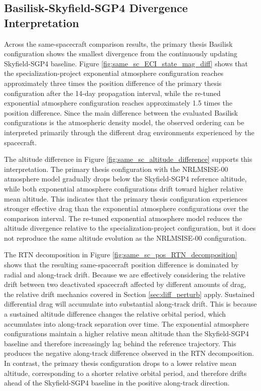 \subsection{Basilisk-Skyfield-SGP4 Divergence Interpretation}

Across the same-spacecraft comparison results, the primary thesis Basilisk configuration shows the smallest divergence from the continuously updating Skyfield-SGP4 baseline. Figure \ref{fig:same_sc_ECI_state_mag_diff} shows that the specialization-project exponential atmosphere configuration reaches approximately three times the position difference of the primary thesis configuration after the 14-day propagation interval, while the re-tuned exponential atmosphere configuration reaches approximately 1.5 times the position difference. Since the main difference between the evaluated Basilisk configurations is the atmospheric density model, the observed ordering can be interpreted primarily through the different drag environments experienced by the spacecraft.

The altitude difference in Figure \ref{fig:same_sc_altitude_difference} supports this interpretation. The primary thesis configuration with the NRLMSISE-00 atmosphere model gradually drops below the Skyfield-SGP4 reference altitude, while both exponential atmosphere configurations drift toward higher relative mean altitude. This indicates that the primary thesis configuration experiences stronger effective drag than the exponential atmosphere configurations over the comparison interval. The re-tuned exponential atmosphere model reduces the altitude divergence relative to the specialization-project configuration, but it does not reproduce the same altitude evolution as the NRLMSISE-00 configuration.

The RTN decomposition in Figure \ref{fig:same_sc_pos_RTN_decomposition} shows that the resulting same-spacecraft position difference is dominated by radial and along-track drift. Because we are effectively considering the relative drift between two deactivated spacecraft affected by different amounts of drag, the relative drift mechanics covered in Section \ref{sec:diff_perturb} apply. Sustained differential drag will accumulate into substantial along-track drift. This is because a sustained altitude difference changes the relative orbital period, which accumulates into along-track separation over time. The exponential atmosphere configurations maintain a higher relative mean altitude than the Skyfield-SGP4 baseline and therefore increasingly lag behind the reference trajectory. This produces the negative along-track difference observed in the RTN decomposition. In contrast, the primary thesis configuration drops to a lower relative mean altitude, corresponding to a shorter relative orbital period, and therefore drifts ahead of the Skyfield-SGP4 baseline in the positive along-track direction.

